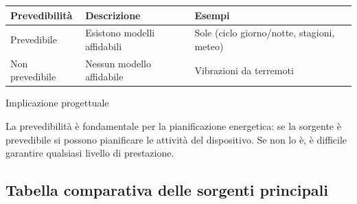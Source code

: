 \documentclass[
  italian,
  openany]{book}
\newcounter{none} %
\begin{document}
{\def\LTcaptype{none} %
\begin{longtable}[]{@{}
  >{\raggedright\arraybackslash}p{}
  >{\raggedright\arraybackslash}p{}
  >{\raggedright\arraybackslash}p{}@{}}
\toprule\noalign{}
\begin{minipage}[b]{\linewidth}\raggedright
Prevedibilità
\end{minipage} & \begin{minipage}[b]{\linewidth}\raggedright
Descrizione
\end{minipage} & \begin{minipage}[b]{\linewidth}\raggedright
Esempi
\end{minipage} \\
\midrule\noalign{}
\endhead
\bottomrule\noalign{}
\endlastfoot
Prevedibile & Esistono modelli affidabili & Sole (ciclo giorno/notte,
stagioni, meteo) \\
Non prevedibile & Nessun modello affidabile & Vibrazioni da terremoti \\
\end{longtable}
}

\begin{callouttip}{Implicazione progettuale}

La prevedibilità è fondamentale per la pianificazione energetica: se la
sorgente è prevedibile si possono pianificare le attività del
dispositivo. Se non lo è, è difficile garantire qualsiasi livello di
prestazione.

\end{callouttip}

\subsection{Tabella comparativa delle sorgenti
principali}\label{tabella-comparativa-delle-sorgenti-principali}
\end{document}
